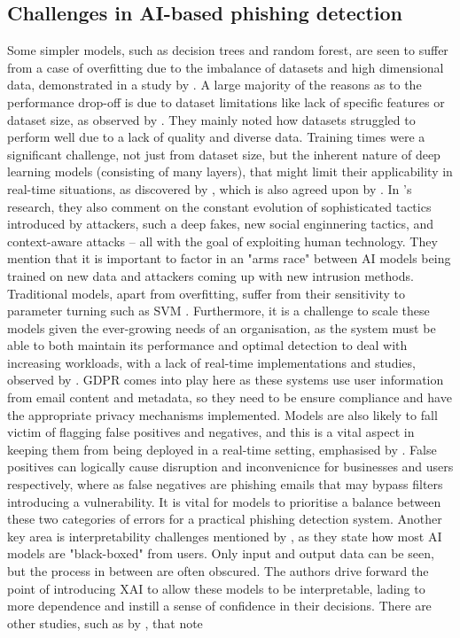 
\subsection*{Challenges in AI-based phishing detection}

Some simpler models, such as decision trees and random forest, are seen to suffer from a case of overfitting due to the imbalance of datasets and high dimensional data, demonstrated in a study by \cite{harikrishnan2018machine}. A large majority of the reasons as to the performance drop-off is due to dataset limitations like lack of specific features or dataset size, as observed by \cite{ahmad2024across}. They mainly noted how datasets struggled to perform well due to a lack of quality and diverse data. Training times were a significant challenge, not just from dataset size, but the inherent nature of deep learning models (consisting of many layers), that might limit their applicability in real-time situations, as discovered by \cite{kapoor2024comparative}, which is also agreed upon by \cite{atlam2022business}. In \cite{kapoor2024comparative}'s research, they also comment on the constant evolution of sophisticated tactics introduced by attackers, such a deep fakes, new social enginnering tactics, and context-aware attacks -- all with the goal of exploiting human technology. They mention that it is important to factor in an "arms race" between AI models being trained on new data and attackers coming up with new intrusion methods. Traditional models, apart from overfitting, suffer from their sensitivity to parameter turning such as SVM \citep{andriu2023adaptive}. Furthermore, it is a challenge to scale these models given the ever-growing needs of an organisation, as the system must be able to both maintain its performance and optimal detection to deal with increasing workloads, with a lack of real-time implementations and studies, observed by \cite{atlam2022business}. GDPR comes into play here as these systems use user information from email content and metadata, so they need to be ensure compliance and have the appropriate privacy mechanisms implemented. Models are also likely to fall victim of flagging false positives and negatives, and this is a vital aspect in keeping them from being deployed in a real-time setting, emphasised by \cite{vishwanath2011people}. False positives can logically cause disruption and inconvenicnce for businesses and users respectively, where as false negatives are phishing emails that may bypass filters introducing a vulnerability. It is vital for models to prioritise a balance between these two categories of errors for a practical phishing detection system. Another key area is interpretability challenges mentioned by \cite{atlam2022business}, as they state how most AI models are "black-boxed" from users. Only input and output data can be seen, but the process in between are often obscured. The authors drive forward the point of introducing XAI to allow these models to be interpretable, lading to more dependence and instill a sense of confidence in their decisions. There are other studies, such as by \cite{al2024novel}, that note 
